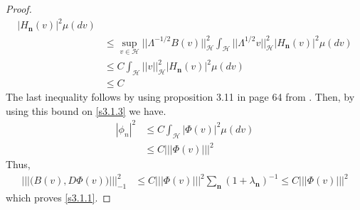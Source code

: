 \documentclass[review, onefignum, onetabnum]{siamart171218}
\begin{document}
\begin{proof}
\begin{align*}
\big|H_{\mathbf{n}}(v)\big|^2 \mu(dv)\\
& \le \sup_{v\in\mathcal{H}} \big|\big|\Lambda^{-1/2}B(v) 
\big|\big|_{\mathcal{H}}^2 
\int_{\mathcal{H}} \big|\big|\Lambda^{1/2}v \big|\big|_{\mathcal{H}}^2 
\big|H_{\mathbf{n}}(v)\big|^2 \mu(dv)\\
& \le C \int_{\mathcal{H}} \big|\big|v \big|\big|_{\mathcal{H}}^2 
\big|H_{\mathbf{n}}(v)\big|^2 \mu(dv)\\
& \le C
\end{align*}
%
The last inequality follows by using proposition 3.11 in page 64 from 
\cite{da1}. Then, by using this bound on \eqref{s3.1.3} we have.
\begin{align*}
| \phi_n |^2 &\le C \int_{\mathcal{H}}\big|  \Phi(v)\big|^2  \mu(dv)\\
&\le C |||\Phi(v) |||^2
 \end{align*}
 Thus,
  \begin{align*}
  ||| \big(B(v),D\Phi(v) \big) |||_{-1}^2 &\le C |||\Phi(v) 
|||^2\sum_{\mathbf{n}} (1+\lambda_{\mathbf{n}})^{-1}  \le C |||\Phi(v) |||^2
 \end{align*}
 which proves \eqref{s3.1.1}.
 

\end{proof}
\end{document}
